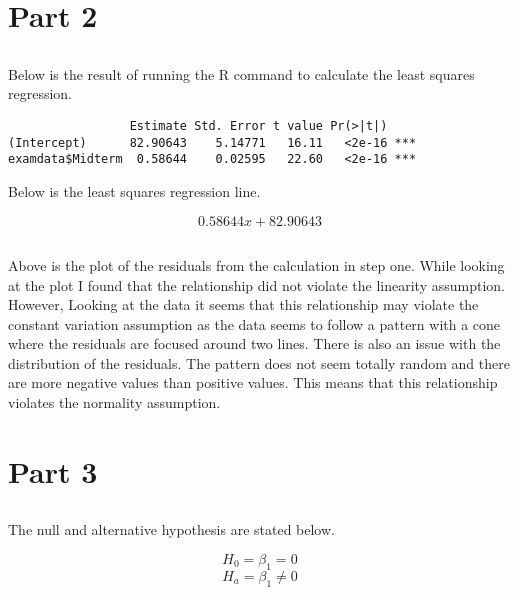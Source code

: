 \documentclass[letterpaper, onecolumn,10pt]{IEEEtran}
\begin{document}
        \section{Part 2}
            \subsection{}
            Below is the result of running the R command to calculate the least squares regression.
            \begin{lstlisting}
                 Estimate Std. Error t value Pr(>|t|)    
(Intercept)      82.90643    5.14771   16.11   <2e-16 ***
examdata$Midterm  0.58644    0.02595   22.60   <2e-16 ***
            \end{lstlisting}
            Below is the least squares regression line.
            
            \[
                0.58644x + 82.90643
            \]
            
            \subsection{}
             
             Above is the plot of the residuals from the calculation in step one. While looking at the plot I found that the relationship did not violate the linearity assumption. However, Looking at the data it seems that this relationship may violate the constant variation assumption as the data seems to follow a pattern with a cone where the residuals are focused around two lines. There is also an issue with the distribution of the residuals. The pattern does not seem totally random and there are more negative values than positive values. This means that this relationship violates the normality assumption.\\
        
        \section{Part 3}
            \subsection{}
            The null and alternative hypothesis are stated below.
            
            \[
                H_0 = \beta_1 = 0
            \]
            \[
                H_a =  \beta_1 \neq 0
            \]
            
\end{document}
